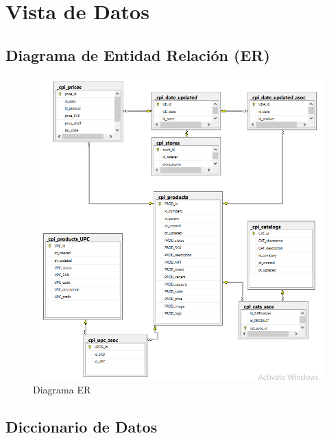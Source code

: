 \section{Vista de Datos} \label{vistaDatos}
    \subsection{Diagrama de Entidad Relación (ER)}
    \begin{figure}[H]
        \includegraphics[scale=0.8]{er.png}
        \caption{Diagrama ER}
        \label{fig:er_diagram}
        \centering
    \end{figure}
    \subsection{Diccionario de Datos}
